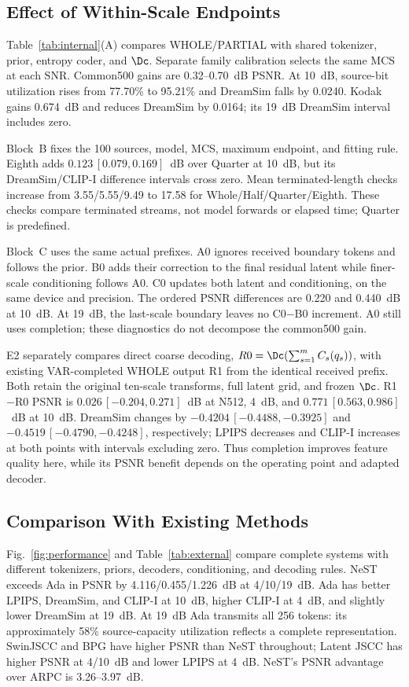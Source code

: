 \subsection{Effect of Within-Scale Endpoints}

Table~\ref{tab:internal}(A) compares WHOLE/PARTIAL with shared tokenizer, prior, entropy coder, and $\Dc$. Separate family calibration selects the same MCS at each SNR. Common500 gains are 0.32--0.70~dB PSNR. At 10~dB, source-bit utilization rises from 77.70\% to 95.21\% and DreamSim falls by 0.0240. Kodak gains 0.674~dB and reduces DreamSim by 0.0164; its 19~dB DreamSim interval includes zero.

Block~B fixes the 100 sources, model, MCS, maximum endpoint, and fitting rule. Eighth adds $0.123\,[0.079,0.169]$~dB over Quarter at 10~dB, but its DreamSim/CLIP-I difference intervals cross zero. Mean terminated-length checks increase from 3.55/5.55/9.49 to 17.58 for Whole/Half/Quarter/Eighth. These checks compare terminated streams, not model forwards or elapsed time; Quarter is predefined.

Block~C uses the same actual prefixes. A0 ignores received boundary tokens and follows the prior. B0 adds their correction to the final residual latent while finer-scale conditioning follows A0. C0 updates both latent and conditioning, on the same device and precision. The ordered PSNR differences are 0.220 and 0.440~dB at 10~dB. At 19~dB, the last-scale boundary leaves no C0$-$B0 increment. A0 still uses completion; these diagnostics do not decompose the common500 gain.

E2 separately compares direct coarse decoding, $R0=\Dc(\sum_{s=1}^{m}C_s(q_s))$, with existing VAR-completed WHOLE output R1 from the identical received prefix. Both retain the original ten-scale transforms, full latent grid, and frozen $\Dc$. R1$-$R0 PSNR is $0.026\,[-0.204,0.271]$~dB at N512, 4~dB, and $0.771\,[0.563,0.986]$~dB at 10~dB. DreamSim changes by $-0.4204\,[-0.4488,-0.3925]$ and $-0.4519\,[-0.4790,-0.4248]$, respectively; LPIPS decreases and CLIP-I increases at both points with intervals excluding zero. Thus completion improves feature quality here, while its PSNR benefit depends on the operating point and adapted decoder.

\subsection{Comparison With Existing Methods}

Fig.~\ref{fig:performance} and Table~\ref{tab:external} compare complete systems with different tokenizers, priors, decoders, conditioning, and decoding rules. NeST exceeds Ada in PSNR by 4.116/0.455/1.226~dB at 4/10/19~dB. Ada has better LPIPS, DreamSim, and CLIP-I at 10~dB, higher CLIP-I at 4~dB, and slightly lower DreamSim at 19~dB. At 19~dB Ada transmits all 256 tokens: its approximately 58\% source-capacity utilization reflects a complete representation. SwinJSCC and BPG have higher PSNR than NeST throughout; Latent JSCC has higher PSNR at 4/10~dB and lower LPIPS at 4~dB. NeST's PSNR advantage over ARPC is 3.26--3.97~dB.

